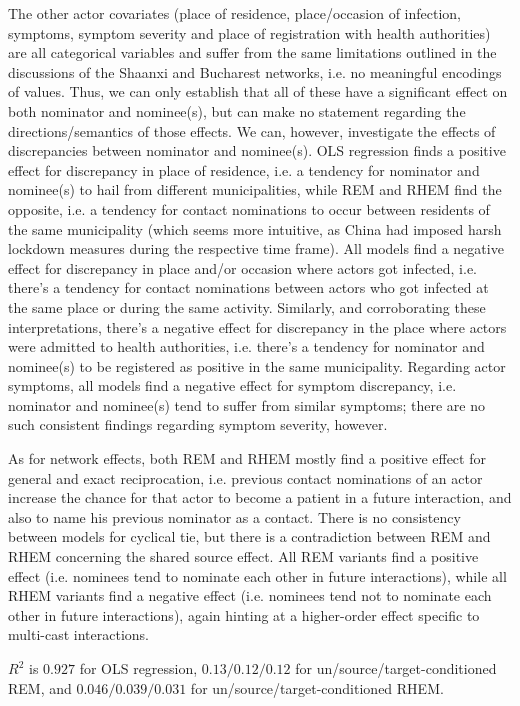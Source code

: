The other actor covariates (place of residence, place/occasion of infection, symptoms, symptom severity and place of registration with health authorities) are all categorical variables and suffer from the same limitations outlined in the discussions of the Shaanxi and Bucharest networks, i.e. no meaningful encodings of values. Thus, we can only establish that all of these have a significant effect on both nominator and nominee(s), but can make no statement regarding the directions/semantics of those effects. We can, however, investigate the effects of discrepancies between nominator and nominee(s). OLS regression finds a positive effect for discrepancy in place of residence, i.e. a tendency for nominator and nominee(s) to hail from different municipalities, while REM and RHEM find the opposite, i.e. a tendency for contact nominations to occur between residents of the same municipality (which seems more intuitive, as China had imposed harsh lockdown measures during the respective time frame). All models find a negative effect for discrepancy in place and/or occasion where actors got infected, i.e. there's a tendency for contact nominations between actors who got infected at the same place or during the same activity. Similarly, and corroborating these interpretations, there's a negative effect for discrepancy in the place where actors were admitted to health authorities, i.e. there's a tendency for nominator and nominee(s) to be registered as positive in the same municipality. Regarding actor symptoms, all models find a negative effect for symptom discrepancy, i.e. nominator and nominee(s) tend to suffer from similar symptoms; there are no such consistent findings regarding symptom severity, however.

As for network effects, both REM and RHEM mostly find a positive effect for general and exact reciprocation, i.e. previous contact nominations of an actor increase the chance for that actor to become a patient in a future interaction, and also to name his previous nominator as a contact. There is no consistency between models for cyclical tie, but there is a contradiction between REM and RHEM concerning the shared source effect. All REM variants find a positive effect (i.e. nominees tend to nominate each other in future interactions), while all RHEM variants find a negative effect (i.e. nominees tend not to nominate each other in future interactions), again hinting at a higher-order effect specific to multi-cast interactions.

$R^2$ is $0.927$ for OLS regression, $0.13/0.12/0.12$ for un/source/target-conditioned REM, and $0.046/0.039/0.031$ for un/source/target-conditioned RHEM.

